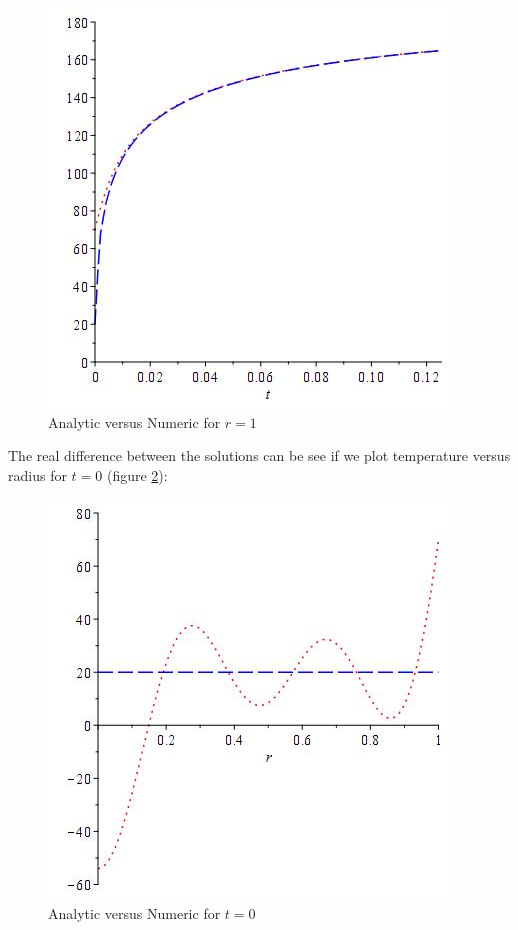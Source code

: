 \documentclass{report}
\begin{document}
\begin{figure}[h]
\centering
\includegraphics[scale = 0.25]{compare-02}
\caption{Analytic versus Numeric for $r = 1$}
\label{fig:c2}
\end{figure}

The real difference between the solutions can be see if we plot temperature versus radius for $t = 0$ (figure \ref{fig:c3}):\bigskip

\begin{figure}[h]
\centering
\includegraphics[scale = 0.25]{compare-03}
\caption{Analytic versus Numeric for $t = 0$}
\label{fig:c3}
\end{figure}
\end{document}
